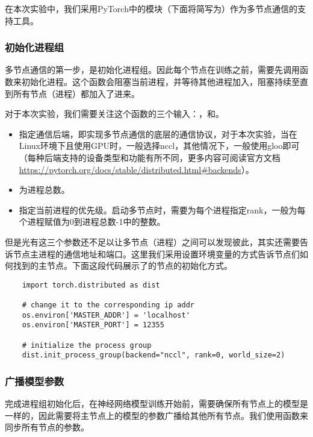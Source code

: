 在本次实验中，我们采用PyTorch中的模块（下面将简写为）作为多节点通信的支持工具。

\subsubsection{初始化进程组}\label{subsubsec:task2-init-process-group}

多节点通信的第一步，是初始化进程组。因此每个节点在训练之前，需要先调用函数来初始化进程。这个函数会阻塞当前进程，并等待其他进程加入，阻塞持续至直到所有节点（进程）都加入了进来。

对于本次实验，我们需要关注这个函数的三个输入：，和。
\begin{itemize}
    \item {}指定通信后端，即实现多节点通信的底层的通信协议，对于本次实验，当在Linux环境下且使用GPU时，一般选择nccl，其他情况下，一般使用gloo即可（每种后端支持的设备类型和功能有所不同，更多内容可阅读官方文档\url{https://pytorch.org/docs/stable/distributed.html#backends}）。
    \item {}为进程总数。
    \item {}指定当前进程的优先级。启动多节点时，需要为每个进程指定rank，一般为每个进程赋值为0到进程总数-1中的整数。
\end{itemize}

但是光有这三个参数还不足以让多节点（进程）之间可以发现彼此，其实还需要告诉节点主进程的通信地址和端口。这里我们采用设置环境变量的方式告诉节点们如何找到的主节点。下面这段代码展示了的节点的初始化方式。
\begin{lstlisting}
    import torch.distributed as dist

    # change it to the corresponding ip addr
    os.environ['MASTER_ADDR'] = 'localhost'
    os.environ['MASTER_PORT'] = 12355
    
    # initialize the process group
    dist.init_process_group(backend="nccl", rank=0, world_size=2)
\end{lstlisting}

\subsubsection{广播模型参数}

完成进程组初始化后，在神经网络模型训练开始前，需要确保所有节点上的模型是一样的，因此需要将主节点上的模型的参数广播给其他所有节点。我们使用函数来同步所有节点的参数。


